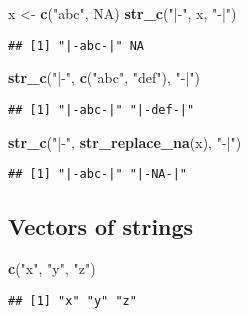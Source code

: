 \documentclass[
]{article}
\newenvironment{Shaded}{\begin{snugshade}}{\end{snugshade}}
\newcommand{\KeywordTok}[1]{\textcolor[rgb]{0.13,0.29,0.53}{\textbf{#1}}}
\newcommand{\NormalTok}[1]{#1}
\newcommand{\OtherTok}[1]{\textcolor[rgb]{0.56,0.35,0.01}{#1}}
\newcommand{\StringTok}[1]{\textcolor[rgb]{0.31,0.60,0.02}{#1}}
\begin{document}
\begin{Shaded}
\begin{Highlighting}[]
\NormalTok{x \textless{}{-}}\StringTok{ }\KeywordTok{c}\NormalTok{(}\StringTok{"abc"}\NormalTok{, }\OtherTok{NA}\NormalTok{)}
\KeywordTok{str\_c}\NormalTok{(}\StringTok{"|{-}"}\NormalTok{, x, }\StringTok{"{-}|"}\NormalTok{)}
\end{Highlighting}
\end{Shaded}

\begin{verbatim}
## [1] "|-abc-|" NA
\end{verbatim}

\begin{Shaded}
\begin{Highlighting}[]
\KeywordTok{str\_c}\NormalTok{(}\StringTok{"|{-}"}\NormalTok{, }\KeywordTok{c}\NormalTok{(}\StringTok{"abc"}\NormalTok{, }\StringTok{"def"}\NormalTok{), }\StringTok{"{-}|"}\NormalTok{)}
\end{Highlighting}
\end{Shaded}

\begin{verbatim}
## [1] "|-abc-|" "|-def-|"
\end{verbatim}

\begin{Shaded}
\begin{Highlighting}[]
\KeywordTok{str\_c}\NormalTok{(}\StringTok{"|{-}"}\NormalTok{, }\KeywordTok{str\_replace\_na}\NormalTok{(x), }\StringTok{"{-}|"}\NormalTok{)}
\end{Highlighting}
\end{Shaded}

\begin{verbatim}
## [1] "|-abc-|" "|-NA-|"
\end{verbatim}

\hypertarget{vectors-of-strings}{%
\subsection{Vectors of strings}\label{vectors-of-strings}}

\begin{Shaded}
\begin{Highlighting}[]
\KeywordTok{c}\NormalTok{(}\StringTok{"x"}\NormalTok{, }\StringTok{"y"}\NormalTok{, }\StringTok{"z"}\NormalTok{)}
\end{Highlighting}
\end{Shaded}

\begin{verbatim}
## [1] "x" "y" "z"
\end{verbatim}
\end{document}
